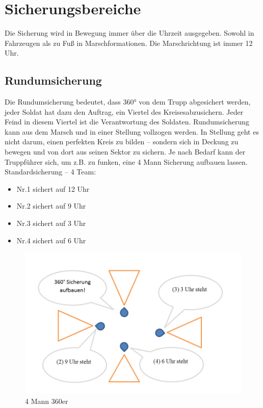 \newpage

\section{Sicherungsbereiche}
	Die Sicherung wird in Bewegung immer über die Uhrzeit ausgegeben. Sowohl in Fahrzeugen als zu Fuß in Marschformationen.  Die Marschrichtung ist immer 12 Uhr. \\

\subsection{Rundumsicherung}
	Die Rundumsicherung bedeutet, dass 360° von dem Trupp abgesichert werden, jeder Soldat hat dazu den Auftrag, ein Viertel des \glqq Kreises\grqq abzusichern. Jeder Feind in diesem Viertel ist die Verantwortung des Soldaten. Rundumsicherung kann aus dem Marsch und in einer Stellung vollzogen werden. In Stellung geht es nicht darum, einen perfekten Kreis zu bilden – sondern sich in Deckung zu bewegen und von dort aus seinen Sektor zu sichern. Je nach Bedarf kann der Truppführer sich, um z.B. zu funken, eine 4 Mann Sicherung aufbauen lassen. \\
	Standardsicherung  – 4 Team: 
		\begin{itemize}
			\item Nr.1 sichert auf 12 Uhr 
			\item Nr.2 sichert auf 9 Uhr 
			\item Nr.3 sichert auf 3 Uhr 
			\item Nr.4 sichert auf 6 Uhr 
		\end{itemize}

		\begin{figure}[htbp]
			\centering
			\includegraphics[width=15cm]{./img/grundlagen/sicherungen/360er.png}
			\caption{4 Mann 360er}
		\end{figure}


